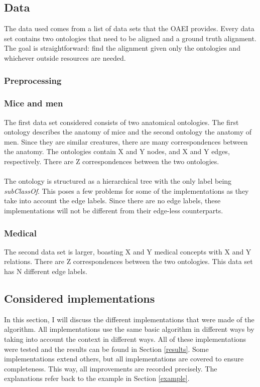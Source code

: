 \documentclass{article}
\begin{document}
  \subsection{Data}
 The data used comes from a list of data sets that the OAEI provides\cite{euzenat2013ontology}. %
 Every data set contains two ontologies that need to be aligned and a ground truth alignment. The goal is straightforward: find the alignment given only the ontologies and whichever outside resources are needed.

 \subsubsection{Preprocessing} \label{preprocessing}

 \subsubsection{Mice and men}
 The first data set considered consists of two anatomical ontologies. The first ontology describes the anatomy of mice and the second ontology the anatomy of men. Since they are similar creatures, there are many correspondences between the anatomy. The ontologies contain X and Y nodes, and X and Y edges, respectively. There are Z correspondences between the two ontologies.
 \paragraph{}
 The ontology is structured as a hierarchical tree with the only label being \emph{subClassOf}. This poses a few problems for some of the implementations as they take into account the edge labels. Since there are no edge labels, these implementations will not be different from their edge-less counterparts.
 \subsubsection{Medical}
 The second data set is larger, boasting X and Y medical concepts with X and Y relations. There are Z correspondences between the two ontologies. This data set has N different edge labels.
 
 \subsection{Considered implementations}
 In this section, I will discuss the different implementations that were made of the algorithm. All implementations use the same basic algorithm in different ways by taking into account the context in different ways. All of these implementations were tested and the results can be found in Section \ref{results}. Some implementations extend others, but all implementations are covered to ensure completeness. This way, all improvements are recorded precisely.
 The explanations refer back to the example in Section \ref{example}.
\end{document}
